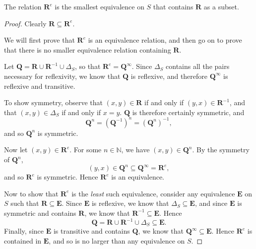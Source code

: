 \begin{lemma}
  \label{lem:re}
  The relation $\mathbf{R}^e$ is the smallest equivalence on $S$ that contains
  $\mathbf{R}$ as a subset.
  \begin{proof}
    Clearly $\mathbf{R} \subseteq \mathbf{R}^e$.

    We will first prove that $\mathbf{R}^e$ is an equivalence relation, and then
    go on to prove that there is no smaller equivalence relation containing
    $\mathbf{R}$.

    Let $\mathbf{Q} = \mathbf{R} \cup \mathbf{R}^{-1} \cup \Delta_S$, so that
    $\mathbf{R}^e = \mathbf{Q}^\infty$.  Since $\Delta_S$ contains all the
    pairs necessary for reflexivity, we know that $\mathbf{Q}$ is reflexive,
    and therefore $\mathbf{Q}^\infty$ is reflexive and transitive.

    To show symmetry, observe that $(x,y) \in \mathbf{R}$ if and only if $(y,x)
    \in \mathbf{R}^{-1}$, and that $(x,y) \in \Delta_S$ if and only if $x=y$.
    $\mathbf{Q}$ is therefore certainly symmetric, and
    $$\mathbf{Q}^n = (\mathbf{Q}^{-1})^n = (\mathbf{Q}^n)^{-1},$$
    and so $\mathbf{Q}^n$ is symmetric.

    Now let $(x,y) \in \mathbf{R}^e$.  For some $n \in \mathbb{N}$, we have
    $(x,y) \in \mathbf{Q}^n$.  By the symmetry of $\mathbf{Q}^n$,
    $$(y,x) \in \mathbf{Q}^n \subseteq \mathbf{Q}^\infty = \mathbf{R}^e,$$
    and so $\mathbf{R}^e$ is symmetric.  Hence $\mathbf{R}^e$ is an equivalence.

    Now to show that $\mathbf{R}^e$ is the \textit{least} such equivalence,
    consider any equivalence $\mathbf{E}$ on $S$ such that $\mathbf{R} \subseteq
    \mathbf{E}$.  Since $\mathbf{E}$ is reflexive, we know that $\Delta_S
    \subseteq \mathbf{E}$, and since $\mathbf{E}$ is symmetric and contains
    $\mathbf{R}$, we know that $\mathbf{R}^{-1} \subseteq \mathbf{E}$.  Hence
    $$\mathbf{Q}=\mathbf{R}\cup\mathbf{R}^{-1}\cup\Delta_S \subseteq \mathbf{E}.$$
    Finally, since $\mathbf{E}$ is transitive and contains $\mathbf{Q}$, we know
    that $\mathbf{Q}^\infty \subseteq \mathbf{E}$.  Hence $\mathbf{R}^e$ is
    contained in $\mathbf{E}$, and so is no larger than any equivalence on $S$.
  \end{proof}
\end{lemma}

